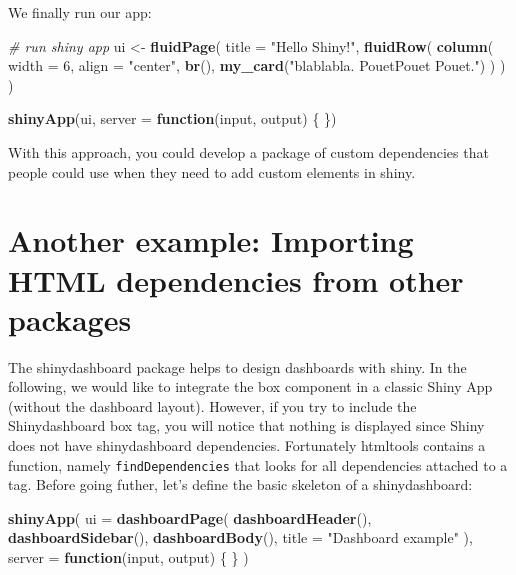 \documentclass[]{book}
\newenvironment{Shaded}{\begin{snugshade}}{\end{snugshade}}
\newcommand{\CommentTok}[1]{\textcolor[rgb]{0.56,0.35,0.01}{\textit{#1}}}
\newcommand{\ControlFlowTok}[1]{\textcolor[rgb]{0.13,0.29,0.53}{\textbf{#1}}}
\newcommand{\DataTypeTok}[1]{\textcolor[rgb]{0.13,0.29,0.53}{#1}}
\newcommand{\DecValTok}[1]{\textcolor[rgb]{0.00,0.00,0.81}{#1}}
\newcommand{\KeywordTok}[1]{\textcolor[rgb]{0.13,0.29,0.53}{\textbf{#1}}}
\newcommand{\NormalTok}[1]{#1}
\newcommand{\StringTok}[1]{\textcolor[rgb]{0.31,0.60,0.02}{#1}}
\begin{document}
We finally run our app:

\begin{Shaded}
\begin{Highlighting}[]
\CommentTok{# run shiny app }
\NormalTok{ui <-}\StringTok{ }\KeywordTok{fluidPage}\NormalTok{(}
  \DataTypeTok{title =} \StringTok{"Hello Shiny!"}\NormalTok{,}
  \KeywordTok{fluidRow}\NormalTok{(}
    \KeywordTok{column}\NormalTok{(}
      \DataTypeTok{width =} \DecValTok{6}\NormalTok{,}
      \DataTypeTok{align =} \StringTok{"center"}\NormalTok{,}
      \KeywordTok{br}\NormalTok{(),}
      \KeywordTok{my_card}\NormalTok{(}\StringTok{"blablabla. PouetPouet Pouet."}\NormalTok{)}
\NormalTok{    )}
\NormalTok{  )}
\NormalTok{)}

\KeywordTok{shinyApp}\NormalTok{(ui, }\DataTypeTok{server =} \ControlFlowTok{function}\NormalTok{(input, output) \{ \})}
\end{Highlighting}
\end{Shaded}

With this approach, you could develop a package of custom dependencies that people
could use when they need to add custom elements in shiny.

\hypertarget{another-example-importing-html-dependencies-from-other-packages}{%
\section{Another example: Importing HTML dependencies from other packages}\label{another-example-importing-html-dependencies-from-other-packages}}

The shinydashboard package helps to design dashboards with shiny. In the following, we would like to integrate the box component in a classic Shiny App (without the dashboard layout). However, if you try to include the Shinydashboard box tag, you will notice that nothing is displayed since Shiny does not have shinydashboard dependencies. Fortunately htmltools contains a function, namely \texttt{findDependencies} that looks for all dependencies attached to a tag. Before going futher, let's define the basic skeleton of a shinydashboard:

\begin{Shaded}
\begin{Highlighting}[]
\KeywordTok{shinyApp}\NormalTok{(}
  \DataTypeTok{ui =} \KeywordTok{dashboardPage}\NormalTok{(}
    \KeywordTok{dashboardHeader}\NormalTok{(),}
    \KeywordTok{dashboardSidebar}\NormalTok{(),}
    \KeywordTok{dashboardBody}\NormalTok{(),}
    \DataTypeTok{title =} \StringTok{"Dashboard example"}
\NormalTok{  ),}
  \DataTypeTok{server =} \ControlFlowTok{function}\NormalTok{(input, output) \{ \}}
\NormalTok{)}
\end{Highlighting}
\end{Shaded}
\end{document}
